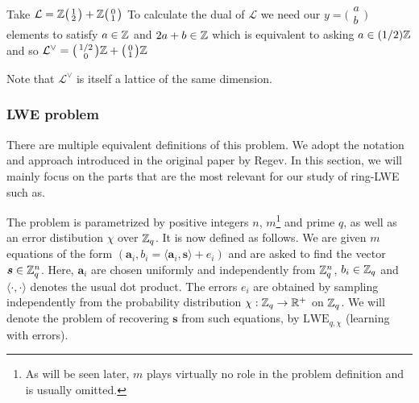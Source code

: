 \begin{example}
    Take $\mathcal{L}= \mathbb{Z} 
        \big(\begin{smallmatrix} 1\\2 \end{smallmatrix}\big) + 
        \mathbb{Z} \big(\begin{smallmatrix} 0\\ 1 \end{smallmatrix}\big)$
        To calculate the dual of $\mathcal{L}$ we need our $y = \big(\begin{smallmatrix}
          a\\b\end{smallmatrix}\big)$ elements to satisfy $a \in \mathbb{Z}$ and $2a + b \in \mathbb{Z}$ which is equivalent to asking $a \in (1/2)\mathbb{Z}$ and so $\mathcal{L}^{\vee} = \big(\begin{smallmatrix}
          1/2\\0
        \end{smallmatrix}\big)\mathbb{Z} + \big(\begin{smallmatrix}
          0\\1
        \end{smallmatrix}\big) \mathbb{Z}$
\end{example}

Note that $\mathcal{L}^{\vee}$ is itself a lattice of the same dimension.
\fi

\subsubsection*{LWE problem}
There are multiple equivalent definitions of this problem. We adopt the notation and approach introduced in the original paper by Regev. In this section, we will mainly focus on the parts that are the most relevant for our study of ring-LWE such as. 

The problem is parametrized by positive integers $n$, $m$\footnote{As will be seen later, $m$ plays virtually no role in the problem definition and is usually omitted.} and prime $q$, as well as an error distibution $\chi$ over $\mathbb{Z}_q$. It is now defined as follows. We are given $m$ equations of the form $(\bm{a}_i, b_i = \langle \bm{a}_i, \bm{s} \rangle + e_i)$ and are asked to find the vector $\boldsymbol{s} \in \mathbb{Z}_q^n$. Here, $\bm{a}_i$ are chosen uniformly and independently from $\mathbb{Z}_q^n$, $b_i \in \mathbb{Z}_q$ and $\langle \cdot, \cdot \rangle$ denotes the usual dot product. The errors $e_i$ are obtained by sampling independently from the probability distribution $\chi : \mathbb{Z}_q \rightarrow \mathbb{R}^{+}$ on $\mathbb{Z}_q$. We will denote the problem of recovering $\bm{s}$ from such equations, by $\text{LWE}_{q, \chi}$ (learning with errors).

